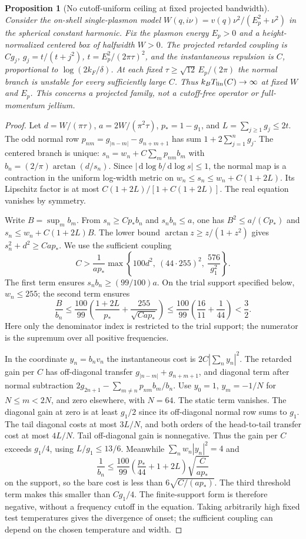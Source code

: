 \documentclass[11pt]{article}
\newtheorem{proposition}[theorem]{Proposition}
\newcommand{\dd}{\,\mathrm{d}}
\newcommand{\Tlin}{T_{\rm lin}}
\begin{document}
\begin{proposition}[No cutoff-uniform ceiling at fixed projected bandwidth]
Consider the on-shell single-plasmon model $W(q,i\nu)=v(q)\nu^2/(E_p^2+\nu^2)$ in the spherical constant harmonic. Fix the plasmon energy $E_p>0$ and a height-normalized centered box of halfwidth $W>0$. The projected retarded coupling is $Cg_j$, $g_j=t/(t+j^2)$, $t=E_p^2/(2\pi\tau)^2$, and the instantaneous repulsion is $C$, proportional to $\log(2k_F/\delta)$. At each fixed $\tau\ge \sqrt{12}\,E_p/(2\pi)$ the normal branch is unstable for every sufficiently large $C$. Thus $k_B\Tlin(C)\to\infty$ at fixed $W$ and $E_p$. This concerns a projected family, not a cutoff-free operator or full-momentum jellium.
\end{proposition}
\begin{proof}
Let $d=W/(\pi\tau)$, $a=2W/(\pi^2\tau)$, $p_*=1-g_1$, and $L=\sum_{j\ge1}g_j\le2t$. The odd normal row $p_{nm}=g_{|n-m|}-g_{n+m+1}$ has sum $1+2\sum_{j=1}^n g_j$. The centered branch is unique: $s_n=w_n+C\sum_m p_{nm}b_m$ with $b_n=(2/\pi)\arctan(d/s_n)$. Since $|\dd\log b/\dd\log s|\le1$, the normal map is a contraction in the uniform log-width metric on $w_n\le s_n\le w_n+C(1+2L)$. Its Lipschitz factor is at most $C(1+2L)/[1+C(1+2L)]$. The real equation vanishes by symmetry.

Write $B=\sup_m b_m$. From $s_n\ge Cp_* b_n$ and $s_n b_n\le a$, one has $B^2\le a/(Cp_*)$ and $s_n\le w_n+C(1+2L)B$. The lower bound $\arctan z\ge z/(1+z^2)$ gives $s_n^2+d^2\ge Cap_*$. We use the sufficient coupling
\[
 C>\frac{1}{ap_*}\max\left\{100d^2,\ (44\cdot255)^2,\ \frac{576}{g_1^2}\right\}.
\]
The first term ensures $s_n b_n\ge(99/100)a$. On the trial support specified below, $w_n\le255$; the second term ensures
\[
 \frac{B}{b_n}\le\frac{100}{99}\left(\frac{1+2L}{p_*}+\frac{255}{\sqrt{Cap_*}}\right)
 \le\frac{100}{99}\left(\frac{16}{11}+\frac1{44}\right)<\frac32 .
\]
Here only the denominator index is restricted to the trial support; the numerator is the supremum over all positive frequencies.

In the coordinate $y_n=b_n v_n$ the instantaneous cost is $2C|\sum_n y_n|^2$. The retarded gain per $C$ has off-diagonal transfer $g_{|n-m|}+g_{n+m+1}$, and diagonal term after normal subtraction $2g_{2n+1}-\sum_{m\ne n}p_{nm}b_m/b_n$. Use $y_0=1$, $y_m=-1/N$ for $N\le m<2N$, and zero elsewhere, with $N=64$. The static term vanishes. The diagonal gain at zero is at least $g_1/2$ since its off-diagonal normal row sums to $g_1$. The tail diagonal costs at most $3L/N$, and both orders of the head-to-tail transfer cost at most $4L/N$. Tail off-diagonal gain is nonnegative. Thus the gain per $C$ exceeds $g_1/4$, using $L/g_1\le13/6$. Meanwhile $\sum_n w_n|y_n|^2=4$ and
\[
 \frac{1}{b_n}\le\frac{100}{99}\left(\frac{p_*}{44}+1+2L\right)\sqrt{\frac{C}{ap_*}}
\]
on the support, so the bare cost is less than $6\sqrt{C/(ap_*)}$. The third threshold term makes this smaller than $C g_1/4$. The finite-support form is therefore negative, without a frequency cutoff in the equation. Taking arbitrarily high fixed test temperatures gives the divergence of onset; the sufficient coupling can depend on the chosen temperature and width.
\end{proof}
\end{document}
